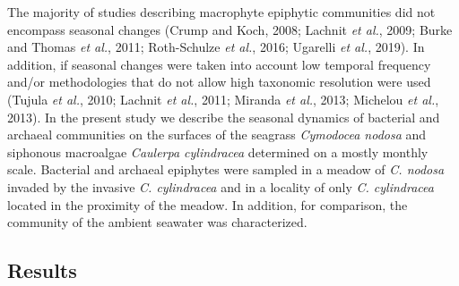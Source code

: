\documentclass[12pt,]{article}
\begin{document}
The majority of studies describing macrophyte epiphytic communities did
not encompass seasonal changes (Crump and Koch, 2008; Lachnit \emph{et
al.}, 2009; Burke and Thomas \emph{et al.}, 2011; Roth-Schulze \emph{et
al.}, 2016; Ugarelli \emph{et al.}, 2019). In addition, if seasonal
changes were taken into account low temporal frequency and/or
methodologies that do not allow high taxonomic resolution were used
(Tujula \emph{et al.}, 2010; Lachnit \emph{et al.}, 2011; Miranda
\emph{et al.}, 2013; Michelou \emph{et al.}, 2013). In the present study
we describe the seasonal dynamics of bacterial and archaeal communities
on the surfaces of the seagrass \emph{Cymodocea nodosa} and siphonous
macroalgae \emph{Caulerpa cylindracea} determined on a mostly monthly
scale. Bacterial and archaeal epiphytes were sampled in a meadow of
\emph{C. nodosa} invaded by the invasive \emph{C. cylindracea} and in a
locality of only \emph{C. cylindracea} located in the proximity of the
meadow. In addition, for comparison, the community of the ambient
seawater was characterized.

\newpage

\hypertarget{results}{%
\subsection{Results}\label{results}}
\end{document}
